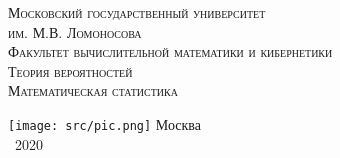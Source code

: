 \begin{titlepage}
    \centering
    \vfill
    {\scshape\large
        Московский государственный университет\\
        им. М.В. Ломоносова\\
        Факультет вычислительной математики и кибернетики\\
   }
    \vskip1cm
    {\scshape\large
        Теория вероятностей\\
        Математическая статистика\\
   }

    \vfill
    \texttt{[image: src/pic.png]}
    \vfill
    {\upshape\large
        Москва\\
        ~2020
   }
\end{titlepage}
